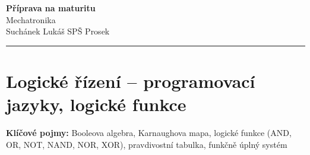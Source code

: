 \documentclass[a4paper,10pt]{article}
\begin{document}
\begin{minipage}[t]{0.75\textwidth}
    {\Huge\bfseries\color{accent} Příprava na maturitu}\\[4pt]
    {\large\color{stripeblue} Mechatronika}\\[2pt]
    \textcolor{medgray}{\small Suchánek Lukáš \quad SPŠ Prosek }
\end{minipage}
\hfill
\begin{minipage}[t]{0.22\textwidth}
    \raggedleft
\end{minipage}

\vspace{6pt}
\noindent\color{accent}\rule{\linewidth}{1.5pt}
\vspace{2pt}

\section{Logické řízení -- programovací jazyky, logické funkce}

\begin{pojmybox}
\textbf{Klíčové pojmy:}
Booleova algebra, Karnaughova mapa, logické funkce (AND, OR, NOT, NAND, NOR, XOR),
pravdivostní tabulka, funkčně úplný systém
\end{pojmybox}
\end{document}

